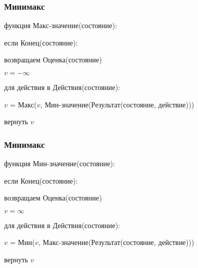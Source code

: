 \documentclass[professionalfonts]{beamer}
\begin{document}
\begin{frame}
	\frametitle{Минимакс}
	функция Макс-значение(состояние):

	\hspace{20pt}
		если Конец(состояние):

		\hspace{40pt}	возвращаем Оценка(состояние)

		\hspace{20pt}$v = -\infty$

		\hspace{20pt}для действия в Действия(состояние):

		\hspace{40pt}	$v$ = Макс($v$, Мин-значение(Результат(состояние, действие)))

		\hspace{20pt}
		вернуть $v$
\end{frame}
\begin{frame}
	\frametitle{Минимакс}
	функция Мин-значение(состояние):

	\hspace{20pt}
		если Конец(состояние):

		\hspace{40pt}	возвращаем Оценка(состояние)

		\hspace{20pt}$v = \infty$

		\hspace{20pt}для действия в Действия(состояние):

		\hspace{40pt}	$v$ = Мин($v$, Макс-значение(Результат(состояние, действие)))

		\hspace{20pt}
		вернуть $v$
\end{frame}
\end{document}
